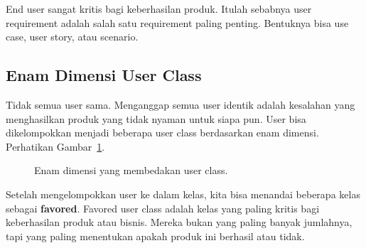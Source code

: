 \documentclass[11pt,a4paper]{article}
\begin{document}
End user sangat kritis bagi keberhasilan produk. Itulah sebabnya user requirement adalah salah satu requirement paling penting. Bentuknya bisa use case, user story, atau scenario.

\subsection{Enam Dimensi User Class}

Tidak semua user sama. Menganggap semua user identik adalah kesalahan yang menghasilkan produk yang tidak nyaman untuk siapa pun. User bisa dikelompokkan menjadi beberapa user class berdasarkan enam dimensi. Perhatikan Gambar~\ref{fig:six-dimensions}.

\begin{figure}[H]
	\centering
	\caption{Enam dimensi yang membedakan user class.}
	\label{fig:six-dimensions}
\end{figure}

Setelah mengelompokkan user ke dalam kelas, kita bisa menandai beberapa kelas sebagai \textbf{favored}. Favored user class adalah kelas yang paling kritis bagi keberhasilan produk atau bisnis. Mereka bukan yang paling banyak jumlahnya, tapi yang paling menentukan apakah produk ini berhasil atau tidak.
\end{document}
